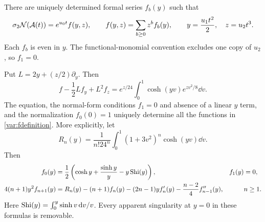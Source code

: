 There are uniquely determined formal series $f_b(y)$ such that
\begin{equation}\label{var:fdefinition}
 \sigma_2\mathcal N(\mathcal A(t))
 =e^{u_0t} f(y,z),\qquad
 f(y,z)=\sum_{b\ge0}z^bf_b(y),\qquad
 y=\frac{u_1t^2}{2},\quad z=u_2t^3.
\end{equation}
Each $f_b$ is even in $y$. The functional-monomial convention excludes
one copy of $u_2$, so $f_1=0$.

\begin{theorem}
\label{var:master}
Put $L=2y+(z/2)\partial_y$. Then
\begin{equation}\label{var:PDE}
 \boxed{\displaystyle
 f-\frac12L f_y+L^2f_z
 =e^{z/24}\int_0^1
          \cosh(yv)e^{zv^2/8}\dd v.}
\end{equation}
The equation, the normal-form conditions $f_1=0$ and absence of a
linear $y$ term, and the normalization $f_0(0)=1$ uniquely determine
all the functions in \eqref{var:fdefinition}.
More explicitly, let
\begin{equation}\label{var:Rn}
 R_n(y)=\frac1{n!24^n}\int_0^1(1+3v^2)^n\cosh(yv)\dd v.
\end{equation}
Then
\begin{align}
 f_0(y)&=\frac12\left(
       \cosh y+\frac{\sinh y}{y}-y\operatorname{Shi}(y)\right),
       & f_1(y)&=0,\label{var:f0}\\
 4(n+1)y^2f_{n+1}(y)
 &=R_n(y)-(n+1)f_n(y)-(2n-1)y f_n'(y)
           -\frac{n-2}{4}f_{n-1}''(y),
       && n\ge1.\label{var:recurrence}
\end{align}
Here $\operatorname{Shi}(y)=\int_0^y\sinh v\,\mathrm d v/v$. Every apparent singularity
at $y=0$ in these formulas is removable.
\end{theorem}

